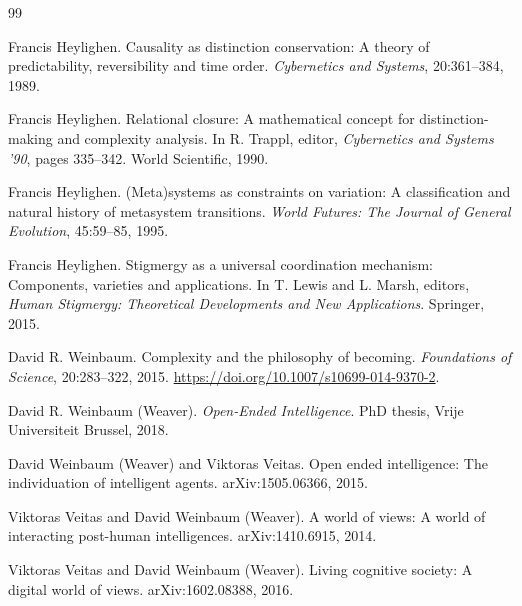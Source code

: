 \documentclass[11pt]{article}
\begin{document}
\begin{thebibliography}{99}

Francis Heylighen.
\newblock Causality as distinction conservation: A theory of predictability,
reversibility and time order.
\newblock \emph{Cybernetics and Systems}, 20:361--384, 1989.

Francis Heylighen.
\newblock Relational closure: A mathematical concept for distinction-making and
complexity analysis.
\newblock In R. Trappl, editor, \emph{Cybernetics and Systems '90}, pages
335--342. World Scientific, 1990.

Francis Heylighen.
\newblock (Meta)systems as constraints on variation: A classification and natural
history of metasystem transitions.
\newblock \emph{World Futures: The Journal of General Evolution}, 45:59--85,
1995.

Francis Heylighen.
\newblock Stigmergy as a universal coordination mechanism: Components, varieties
and applications.
\newblock In T. Lewis and L. Marsh, editors, \emph{Human Stigmergy: Theoretical
Developments and New Applications}. Springer, 2015.

David R. Weinbaum.
\newblock Complexity and the philosophy of becoming.
\newblock \emph{Foundations of Science}, 20:283--322, 2015.
\newblock \url{https://doi.org/10.1007/s10699-014-9370-2}.

David R. Weinbaum (Weaver).
\newblock \emph{Open-Ended Intelligence}.
\newblock PhD thesis, Vrije Universiteit Brussel, 2018.

David Weinbaum (Weaver) and Viktoras Veitas.
\newblock Open ended intelligence: The individuation of intelligent agents.
\newblock arXiv:1505.06366, 2015.

Viktoras Veitas and David Weinbaum (Weaver).
\newblock A world of views: A world of interacting post-human intelligences.
\newblock arXiv:1410.6915, 2014.

Viktoras Veitas and David Weinbaum (Weaver).
\newblock Living cognitive society: A digital world of views.
\newblock arXiv:1602.08388, 2016.

\end{thebibliography}
\end{document}
